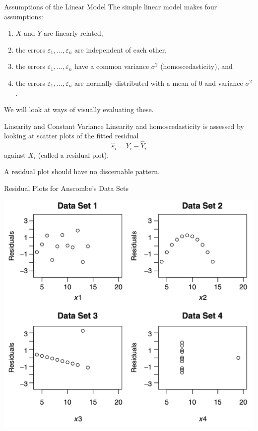 \documentclass{beamer}
\begin{document}
\begin{frame}{Assumptions of the Linear Model}
    The simple linear model makes four assumptions:
    \begin{enumerate}
        \item $X$ and $Y$ are linearly related,
        \item the errors $\varepsilon_1, \ldots, \varepsilon_n$ are independent of each other,
        \item the errors $\varepsilon_1, \ldots, \varepsilon_n$ have a common variance $\sigma^2$ (homoscedasticity), and 
        \item the errors $\varepsilon_1, \ldots, \varepsilon_n$ are normally distributed with a mean of $0$ and variance $\sigma^2$.
    \end{enumerate}
    We will look at ways of visually evaluating these.
\end{frame}

\begin{frame}{Linearity and Constant Variance}
    Linearity and homoscedasticity is assessed by looking at scatter plots of the fitted residual 
    \begin{equation*}
        \hat{\varepsilon}_i = Y_i - \hat{Y}_i
    \end{equation*}
    against $X_i$ (called a residual plot). 

    \vspace{1em}

    A residual plot should have no discernable pattern.
\end{frame}

\begin{frame}{Residual Plots for Anscombe’s Data Sets}
    \begin{center}
        \includegraphics[width=.75\linewidth]{figures/anscombe-resid.png}
    \end{center}
\end{frame}
\end{document}
